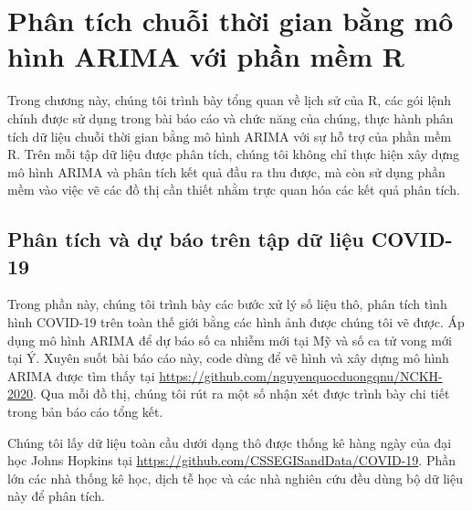 \documentclass[12pt, a4paper,oneside]{book}
\theoremstyle{definition}
\begin{document}
\chapter{Phân tích chuỗi thời gian bằng mô hình ARIMA với phần mềm R}
Trong chương này, chúng tôi trình bày tổng quan về lịch sử của R, các gói lệnh chính được sử dụng trong bài báo cáo và chức năng của chúng, thực hành phân tích dữ liệu chuỗi thời gian bằng mô hình ARIMA với sự hỗ trợ của phần mềm R. Trên mỗi tập dữ liệu được phân tích, chúng tôi không chỉ thực hiện xây dựng mô hình ARIMA và phân tích kết quả đầu ra thu được, mà còn sử dụng phần mềm vào việc vẽ các đồ thị cần thiết nhằm trực quan hóa các kết quả phân tích. 
\section{Phân tích và dự báo trên tập dữ liệu COVID-19}
Trong phần này, chúng tôi trình bày các bước xử lý số liệu thô, phân tích tình hình COVID-19 trên toàn thế giới bằng các hình ảnh được chúng tôi vẽ được. Áp dụng mô hình ARIMA để dự báo số ca nhiễm mới tại Mỹ và số ca tử vong mới tại Ý. Xuyên suốt bài báo cáo này, code dùng để vẽ hình và xây dựng mô hình ARIMA được tìm thấy tại \url{https://github.com/nguyenquocduongqnu/NCKH-2020}. Qua mỗi đồ thị, chúng tôi rút ra một số nhận xét được trình bày chi tiết trong bản báo cáo tổng kết.

Chúng tôi lấy dữ liệu toàn cầu dưới dạng thô được thống kê hàng ngày của đại học Johns Hopkins tại \url{https://github.com/CSSEGISandData/COVID-19}. Phần lớn các nhà thống kê học, dịch tễ học và các nhà nghiên cứu đều dùng bộ dữ liệu này để phân tích.
\end{document}
